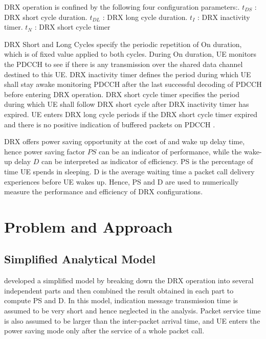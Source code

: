 \documentclass[8pt]{article}
\begin{document}
DRX operation is confined by the following four configuration parameters:. \(t_{DS}\) : DRX short cycle duration. \(t_{DL}\) : DRX long cycle duration. \(t_{I}\) : DRX inactivity timer. \(t_{N}\) : DRX short cycle timer\newline

DRX Short and Long Cycles specify the periodic repetition of On duration, which is of fixed value applied to both cycles. During On duration, UE monitors the PDCCH to see if there is any transmission over the shared data channel destined to this UE. DRX inactivity timer defines the period during which UE shall stay awake monitoring PDCCH after the last successful decoding of PDCCH before entering DRX operation. DRX short cycle timer specifies the period during which UE shall follow DRX short cycle after DRX inactivity timer has expired. UE enters DRX long cycle periods if the DRX short cycle timer expired and there is no positive indication of buffered packets on PDCCH \cite{4657144}.

DRX offers power saving opportunity at the cost of and wake up delay time, hence power saving factor \(PS\) can be an indicator of performance, while the wake-up delay \(D\) can be interpreted as indicator of efficiency. PS is the percentage of time UE spends in sleeping. D is the average waiting time a packet call delivery experiences before UE wakes up. Hence, PS and D are used to numerically measure the performance and efficiency of DRX configurations.

\section*{Problem and Approach}
\subsection*{Simplified Analytical Model}

\cite{6151867} developed a simplified model by breaking down the DRX operation into several independent parts and then combined the result obtained in each part to compute PS and D. In this model, indication message transmission time is assumed to be very short and hence neglected in the analysis. Packet service time is also assumed to be larger than the inter-packet arrival time, and UE enters the power saving mode only after the service of a whole packet call.
\end{document}
